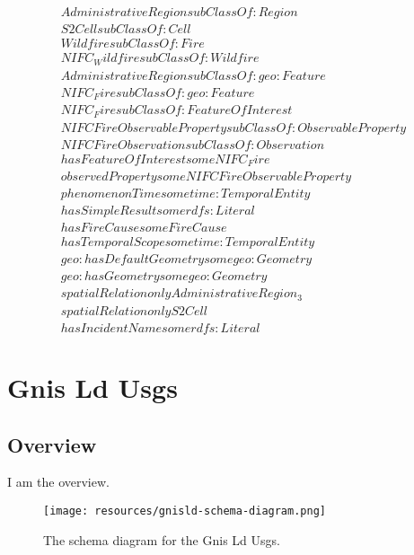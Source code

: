 \begin{align}
  AdministrativeRegion subClassOf: Region\\
  S2Cell subClassOf: Cell\\
  Wildfire subClassOf: Fire\\
  NIFC_Wildfire subClassOf: Wildfire\\
  AdministrativeRegion subClassOf: geo:Feature\\
  NIFC_Fire subClassOf: geo:Feature\\
  NIFC_Fire subClassOf: FeatureOfInterest\\
  NIFCFireObservableProperty subClassOf: ObservableProperty\\
  NIFCFireObservation subClassOf: Observation\\
  hasFeatureOfInterest some NIFC_Fire \\
  observedProperty some NIFCFireObservableProperty \\
  phenomenonTime some time:TemporalEntity \\
  hasSimpleResult some rdfs:Literal \\
  hasFireCause some FireCause \\
  hasTemporalScope some time:TemporalEntity \\
  geo:hasDefaultGeometry some geo:Geometry \\
  geo:hasGeometry some geo:Geometry \\
  spatialRelation only AdministrativeRegion_3 \\
  spatialRelation only S2Cell \\
  hasIncidentName some rdfs:Literal \end{align}



\section{Gnis Ld Usgs}
\label{sec:gnis-ld-usgs}
\subsection{Overview}
\label{ssec:overview}

I am the overview.

\begin{figure}[h!]
  \begin{center}
    \texttt{[image: resources/gnisld-schema-diagram.png]}
  \end{center}
  \caption{The schema diagram for the Gnis Ld Usgs.}
  \label{fig:ov-diagram}
\end{figure}


